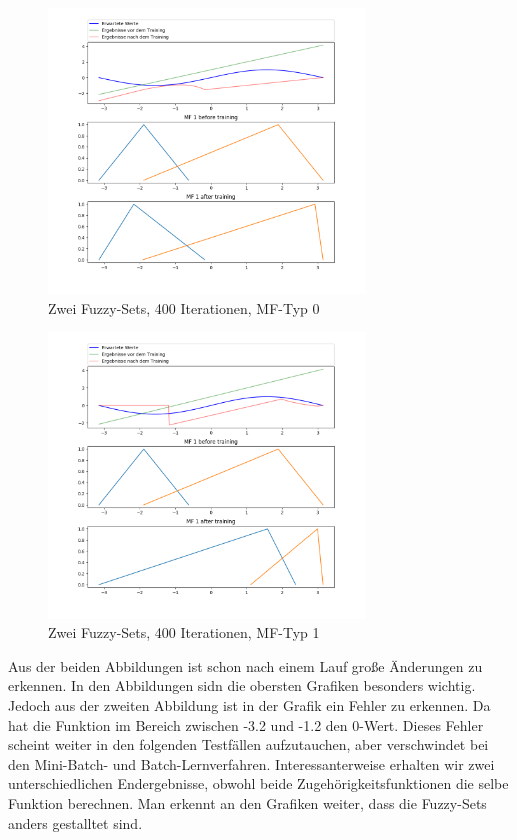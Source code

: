 \begin{figure}[htbp]\label{2Sets400_Stoch_0}
	\centering
	\includegraphics[width=0.75\textwidth]{images/sinus/Stochastic/sinus 1 Input 2 Sets 400 Epochs Stochastic Gradient Descent two equations mf.png}
	\caption{Zwei Fuzzy-Sets, 400 Iterationen, MF-Typ 0}
\end{figure}



\begin{figure}[htbp]\label{2Sets400_Stoch_1}
	\centering
	\includegraphics[width=0.75\textwidth]{images/sinus/Stochastic/sinus 1 Input 2 Sets 400 Epochs Stochastic Gradient Descent one equation mf.png}
	\caption{Zwei Fuzzy-Sets, 400 Iterationen, MF-Typ 1}
\end{figure}

Aus der beiden Abbildungen ist schon nach einem Lauf große Änderungen zu erkennen. In den Abbildungen sidn die obersten Grafiken besonders wichtig. Jedoch aus der zweiten Abbildung ist in der Grafik ein Fehler zu erkennen. Da hat die Funktion im Bereich zwischen -3.2 und -1.2 den 0-Wert. Dieses Fehler scheint weiter in den folgenden Testfällen aufzutauchen, aber verschwindet bei den Mini-Batch- und Batch-Lernverfahren. Interessanterweise erhalten wir zwei unterschiedlichen Endergebnisse, obwohl beide Zugehörigkeitsfunktionen die selbe Funktion berechnen. Man erkennt an den Grafiken weiter, dass die Fuzzy-Sets anders gestalltet sind.

